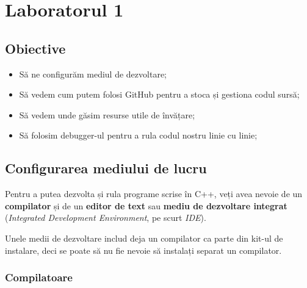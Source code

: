\section*{Laboratorul 1}

\subsection*{Obiective}

\begin{itemize}[label=\checkmark]
    \item Să ne configurăm mediul de dezvoltare;
    \item Să vedem cum putem folosi GitHub pentru a stoca și gestiona codul sursă;
    \item Să vedem unde găsim resurse utile de învățare;
    \item Să folosim debugger-ul pentru a rula codul nostru linie cu linie;
\end{itemize}

\subsection*{Configurarea mediului de lucru}

Pentru a putea dezvolta și rula programe scrise în C++, veți avea nevoie de un \textbf{compilator} și de un \textbf{editor de text} sau \textbf{mediu de dezvoltare integrat} (\textit{Integrated Development Environment}, pe scurt \textit{IDE}).

Unele medii de dezvoltare includ deja un compilator ca parte din kit-ul de instalare, deci se poate să nu fie nevoie să instalați separat un compilator.

\subsubsection*{Compilatoare}

